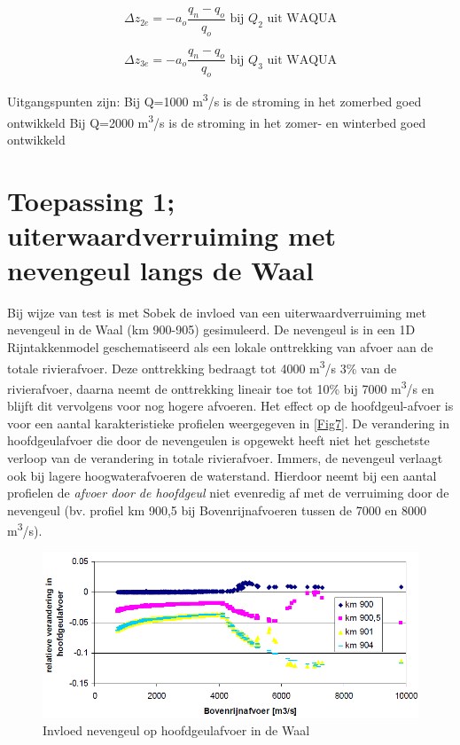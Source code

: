 \begin{equation}
\Delta z_{2e} = -a_o \frac{q_n - q_o}{q_o} \text{ bij $Q_2$ uit WAQUA}
\end{equation}

\begin{equation}
\Delta z_{3e} = -a_o \frac{q_n - q_o}{q_o} \text{ bij $Q_3$ uit WAQUA}
\end{equation}

Uitgangspunten zijn:
Bij Q=1000 m\textsuperscript{3}/s is de stroming in het zomerbed goed ontwikkeld
Bij Q=2000 m\textsuperscript{3}/s is de stroming in het zomer- en winterbed goed ontwikkeld

\section{Toepassing 1; uiterwaardverruiming met nevengeul langs de Waal}

Bij wijze van test is met Sobek de invloed van een uiterwaardverruiming met nevengeul in de Waal (km 900-905) gesimuleerd.
De nevengeul is in een 1D Rijntakkenmodel geschematiseerd als een lokale onttrekking van afvoer aan de totale rivierafvoer.
Deze onttrekking bedraagt tot 4000 m\textsuperscript{3}/s 3\% van de rivierafvoer, daarna neemt de onttrekking lineair toe tot 10\% bij 7000 m\textsuperscript{3}/s en blijft dit vervolgens voor nog hogere afvoeren.
Het effect op de hoofdgeul-afvoer is voor een aantal karakteristieke profielen weergegeven in \autoref{Fig7}.
De verandering in hoofdgeulafvoer die door de nevengeulen is opgewekt heeft niet het geschetste verloop van de verandering in totale rivierafvoer.
Immers, de nevengeul verlaagt ook bij lagere hoogwaterafvoeren de waterstand.
Hierdoor neemt bij een aantal profielen de \emph{afvoer door de hoofdgeul} niet evenredig af met de verruiming door de nevengeul (bv. profiel km 900,5 bij Bovenrijnafvoeren tussen de 7000 en 8000 m\textsuperscript{3}/s).

\begin{figure}
\includegraphics[width=\columnwidth]{figures/Fig7.png}
\caption{Invloed nevengeul op hoofdgeulafvoer in de Waal}
\label{Fig7}
\end{figure}

